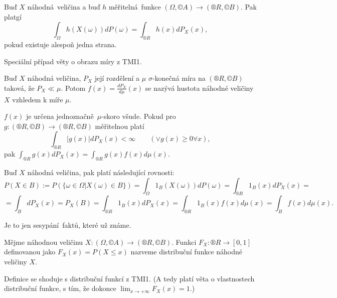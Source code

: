 \documentclass[12pt]{article}					%
\begin{document}
\begin{veta}
	Buď $X$ náhodná veličina a buď $h$ měřitelná funkce $(\Omega, ©A) \rightarrow (®R, ©B)$. Pak platgí
	$$ \int_{\Omega} h(X(\omega)) d P(\omega) = \int_{®R} h(x) d P_X(x), $$
	pokud existuje alespoň jedna strana.

	\begin{dukazin}
		Speciální případ věty o obrazu míry z TMI1.
	\end{dukazin}
\end{veta}

\begin{definice}
	Buď $X$ náhodná veličina, $P_X$ její rozdělení a $\mu$ $\sigma$-konečná míra na $(®R, ©B)$ taková, že $P_X \ll \mu$. Potom $f(x) = \frac{d P_X}{d\mu}(x)$ se nazývá hustota náhodné veličiny $X$ vzhledem k míře $\mu$.

	\begin{poznamkain}
		$f(x)$ je určena jednoznačně $\mu$-skoro všude. Pokud pro $g: (®R, ©B) \rightarrow (®R, ©B)$ měřitelnou platí
		$$ \int_{®R} |g(x)| d P_X(x) < ∞ \qquad (\lor g(x) ≥ 0 \forall x), $$
		pak $\int_{®R} g(x) d P_X(x) = \int_{®R} g(x) f(x) d\mu(x)$.
	\end{poznamkain}
\end{definice}

\begin{veta}
	Buď $X$ náhodná veličina, pak platí následující rovnosti:
	$$ P(X \in B) := P(\{\omega \in \Omega | X(\omega) \in B\}) = \int_{\Omega} 1_B(X(\omega)) d P(\omega) = \int_{®R} 1_B(x) d P_X(x) = $$
	$$ = \int_{B} d P_X(x) = P_X(B) = \int_{®R} 1_B(x) d P_X(x) = \int_{®R} 1_B(x) f(x) d\mu(x) = \int_B f(x) d\mu(x). $$
	
	\begin{dukazin}
		Je to jen sesypání faktů, které už známe.
	\end{dukazin}
\end{veta}

\begin{definice}
	Mějme náhodnou veličinu $X: (\Omega, ©A) \rightarrow (®R, ©B)$. Funkci $F_X: ®R \rightarrow [0, 1]$ definovanou jako $F_X(x) = P(X ≤ x)$ nazveme distribuční funkce náhodné veličiny $X$.

	\begin{poznamkain}
		Definice se shoduje s distribuční funkcí z TMI1. (A tedy platí věta o vlastnostech distribuční funkce, s tím, že dokonce $\lim_{x \rightarrow +\infty} F_X(x) = 1$.)
	\end{poznamkain}
\end{definice}
\end{document}
